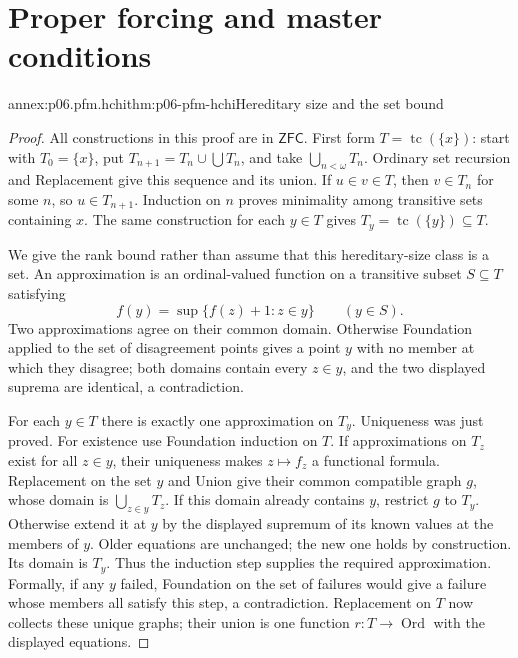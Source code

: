 \section{Proper forcing and master conditions}

\begin{annexitem}{annex:p06.pfm.hchi}{thm:p06-pfm-hchi}{Hereditary size and the set bound}
\begin{proof}
All constructions in this proof are in \(\mathsf{ZFC}\).
First form \(T=\operatorname{tc}(\{x\})\): start with \(T_0=\{x\}\),
put \(T_{n+1}=T_n\cup\bigcup T_n\), and take \(\bigcup_{n<\omega}T_n\).
Ordinary set recursion and Replacement give this sequence and its union.
If \(u\in v\in T\), then \(v\in T_n\) for some \(n\), so
\(u\in T_{n+1}\). Induction on \(n\) proves minimality among transitive
sets containing \(x\). The same construction for each \(y\in T\)
gives \(T_y=\operatorname{tc}(\{y\})\subseteq T\).

We give the rank bound rather than assume that this hereditary-size class
is a set. An approximation is an ordinal-valued function on a transitive
subset \(S\subseteq T\) satisfying
\[
 f(y)=\sup\{f(z)+1:z\in y\}\qquad(y\in S).
\]
Two approximations agree on their common domain. Otherwise Foundation
applied to the set of disagreement points gives a point \(y\) with no
member at which they disagree; both domains contain every \(z\in y\),
and the two displayed suprema are identical, a contradiction.

For each \(y\in T\) there is exactly one approximation on \(T_y\).
Uniqueness was just proved. For existence use Foundation induction on \(T\).
If approximations on \(T_z\) exist for all \(z\in y\), their uniqueness
makes \(z\mapsto f_z\) a functional formula. Replacement on the set \(y\)
and Union give their common compatible graph \(g\), whose domain is
\(\bigcup_{z\in y}T_z\). If this domain already contains \(y\), restrict
\(g\) to \(T_y\). Otherwise extend it at \(y\) by the displayed supremum
of its known values at the members of \(y\). Older equations are unchanged;
the new one holds by construction. Its domain is \(T_y\).
Thus the induction step supplies the required approximation. Formally,
if any \(y\) failed, Foundation on the set of failures would give a failure
whose members all satisfy this step, a contradiction.
Replacement on \(T\) now collects these unique graphs; their union is one
function \(r:T\to\operatorname{Ord}\) with the displayed equations.


\end{proof}
\end{annexitem}
